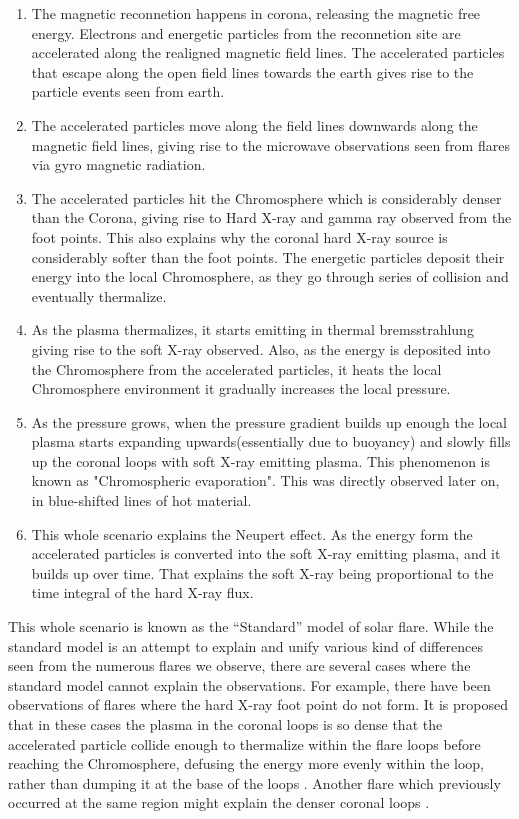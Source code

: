 \begin{enumerate}
    \item The magnetic reconnetion happens in corona, releasing the magnetic free energy. Electrons and energetic particles from the reconnetion site are accelerated along the realigned magnetic field lines. The accelerated particles that escape along the open field lines towards the earth gives rise to the particle events seen from earth.
    \item The accelerated particles move along the field lines downwards along the magnetic field lines, giving rise to the microwave observations seen from flares via gyro magnetic radiation.
    \item The accelerated particles hit the Chromosphere which is considerably denser than the Corona, giving rise to Hard X-ray and gamma ray observed from the foot points. This also explains why the coronal hard X-ray source is considerably softer than the foot points. The energetic particles deposit their energy into the local Chromosphere, as they go through series of collision and eventually thermalize.
    \item  As the plasma thermalizes, it starts emitting in thermal bremsstrahlung giving rise to the soft X-ray observed. Also, as the energy is deposited into the Chromosphere from the accelerated particles, it heats the local Chromosphere environment it gradually increases the local pressure. 
    \item As the pressure grows, when the pressure gradient builds up enough the local plasma starts expanding upwards(essentially due to buoyancy) and slowly fills up the coronal loops with soft X-ray emitting plasma. This phenomenon is known as "Chromospheric evaporation". This was directly observed later on, in blue-shifted lines of hot material.
    \item This whole scenario explains the Neupert effect. As the energy form the accelerated particles is converted into the soft X-ray emitting plasma, and it builds up over time. That explains the soft X-ray being proportional to the time integral of the hard X-ray flux.
\end{enumerate}

This whole scenario is known as the ``Standard'' model of solar flare. While the standard model is an attempt to explain and unify various kind of differences seen from the numerous flares we observe, there are several cases where the standard model cannot explain the observations. For example, there have been observations of flares where the hard X-ray foot point do not form. It is proposed that in these cases the plasma in the coronal loops is so dense that the accelerated particle collide enough to thermalize within the flare loops before reaching the Chromosphere, defusing the energy more evenly within the loop, rather than dumping it at the base of the loops \citep{veronig02,veronig04}. Another flare which previously occurred at the same region might explain the denser coronal loops \citep{strong84,bone07}.  

